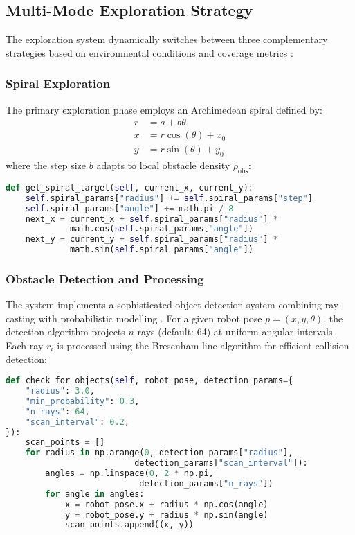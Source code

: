\documentclass{csfourzero}
\begin{document}
\subsection{Multi-Mode Exploration Strategy}

The exploration system dynamically switches between three complementary strategies based on environmental conditions and coverage metrics \cite{LaValle1998}:

\subsubsection{Spiral Exploration}
The primary exploration phase employs an Archimedean spiral defined by:
\[
\begin{aligned}
r &= a + b\theta \\
x &= r\cos(\theta) + x_0 \\
y &= r\sin(\theta) + y_0
\end{aligned}
\]
where the step size $b$ adapts to local obstacle density $\rho_{\text{obs}}$:

\begin{lstlisting}[language=Python]
def get_spiral_target(self, current_x, current_y):
    self.spiral_params["radius"] += self.spiral_params["step"]
    self.spiral_params["angle"] += math.pi / 8
    next_x = current_x + self.spiral_params["radius"] * 
             math.cos(self.spiral_params["angle"])
    next_y = current_y + self.spiral_params["radius"] * 
             math.sin(self.spiral_params["angle"])
\end{lstlisting}

\subsubsection{Obstacle Detection and Processing}

The system implements a sophisticated object detection system combining ray-casting with probabilistic modelling \cite{Khatib1986}. For a given robot pose $p = (x, y, \theta)$, the detection algorithm projects $n$ rays (default: 64) at uniform angular intervals. Each ray $r_i$ is processed using the Bresenham line algorithm for efficient collision detection:

\begin{lstlisting}[language=Python]
def check_for_objects(self, robot_pose, detection_params={
    "radius": 3.0,
    "min_probability": 0.3,
    "n_rays": 64,
    "scan_interval": 0.2,
}):
    scan_points = []
    for radius in np.arange(0, detection_params["radius"], 
                          detection_params["scan_interval"]):
        angles = np.linspace(0, 2 * np.pi, 
                           detection_params["n_rays"])
        for angle in angles:
            x = robot_pose.x + radius * np.cos(angle)
            y = robot_pose.y + radius * np.sin(angle)
            scan_points.append((x, y))
\end{lstlisting}
\end{document}
